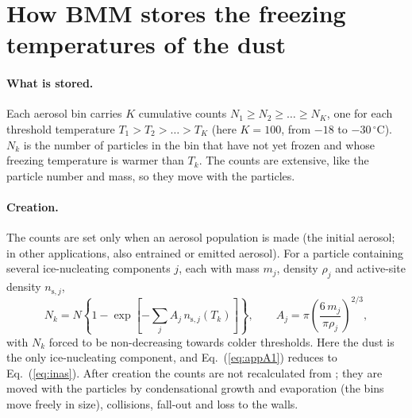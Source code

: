 \appendix

\section{How BMM stores the freezing temperatures of the dust}\label{app:ns}

\paragraph{What is stored.} Each aerosol bin carries $K$ cumulative counts $N_1 \ge N_2 \ge \dots \ge N_K$, one for each threshold temperature $T_1 > T_2 > \dots > T_K$ (here $K = 100$, from $-18$ to $-30\,^\circ$C). $N_k$ is the number of particles in the bin that have not yet frozen and whose freezing temperature is warmer than $T_k$. The counts are extensive, like the particle number and mass, so they move with the particles.

\paragraph{Creation.} The counts are set only when an aerosol population is made (the initial aerosol; in other applications, also entrained or emitted aerosol). For a particle containing several ice-nucleating components $j$, each with mass $m_j$, density $\rho_j$ and active-site density $n_{\mathrm{s},j}$,
\begin{equation}
  N_k = N\left\{1-\exp\!\left[-\sum_j A_j\,n_{\mathrm{s},j}(T_k)\right]\right\}, \qquad A_j = \pi\left(\frac{6\,m_j}{\pi\rho_j}\right)^{2/3},
  \label{eq:appA1}
\end{equation}
with $N_k$ forced to be non-decreasing towards colder thresholds. Here the dust is the only ice-nucleating component, and Eq.~(\ref{eq:appA1}) reduces to Eq.~(\ref{eq:inas}). After creation the counts are not recalculated from \ns; they are moved with the particles by condensational growth and evaporation (the bins move freely in size), collisions, fall-out and loss to the walls.

